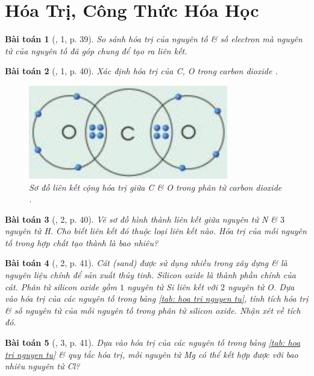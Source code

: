 \documentclass{article}
\newtheorem{baitoan}{Bài toán}
\begin{document}

\section{Hóa Trị, Công Thức Hóa Học}

\begin{baitoan}[\cite{SGK_KHTN_7_Canh_Dieu}, 1, p. 39]
	So sánh hóa trị của nguyên tố \& số electron mà nguyên tử của nguyên tố đã góp chung để tạo ra liên kết.
\end{baitoan}

\begin{baitoan}[\cite{SGK_KHTN_7_Canh_Dieu}, 1, p. 40]
	Xác định hóa trị của \emph{C, O} trong carbon dioxide \emph{}.
	\begin{figure}[H]
		\centering
		\includegraphics[scale=0.3]{CO2}
		\caption{Sơ đồ liên kết cộng hóa trị giữa C \& O trong phân tử carbon dioxide .}
	\end{figure}
\end{baitoan}

\begin{baitoan}[\cite{SGK_KHTN_7_Canh_Dieu}, 2, p. 40]
	Vẽ sơ đồ hình thành liên kết giữa nguyên tử \emph{N} \& $3$ nguyên tử \emph{H}. Cho biết liên kết đó thuộc loại liên kết nào. Hóa trị của mỗi nguyên tố trong hợp chất tạo thành là bao nhiêu?
\end{baitoan}

\begin{baitoan}[\cite{SGK_KHTN_7_Canh_Dieu}, 2, p. 41]
	Cát (sand) được sử dụng nhiều trong xây dựng \& là nguyên liệu chính để sản xuất thủy tinh. Silicon oxide là thành phần chính của cát. Phân tử silicon oxide gồm $1$ nguyên tử Si liên kết với $2$ nguyên tử O. Dựa vào hóa trị của các nguyên tố trong bảng \ref{tab: hoa tri nguyen tu}, tính tích hóa trị \& số nguyên tử của mỗi nguyên tố trong phân tử silicon oxide. Nhận xét về tích đó.
\end{baitoan}

\begin{baitoan}[\cite{SGK_KHTN_7_Canh_Dieu}, 3, p. 41]
	Dựa vào hóa trị của các nguyên tố trong bảng \ref{tab: hoa tri nguyen tu} \& quy tắc hóa trị, mỗi nguyên tử \emph{Mg} có thể kết hợp được với bao nhiêu nguyên tử \emph{Cl}?
\end{baitoan}
\end{document}
